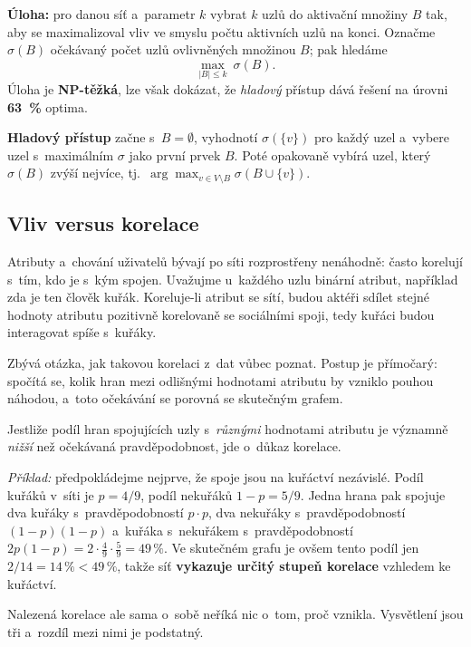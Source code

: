 \documentclass[11pt,a4paper]{article}
\theoremstyle{definition}
\begin{document}
\begin{defbox}
\textbf{Úloha:} pro danou síť a~parametr $k$ vybrat $k$ uzlů do aktivační množiny $B$ tak, aby
se maximalizoval vliv ve smyslu počtu aktivních uzlů na konci. Označme $\sigma(B)$ očekávaný
počet uzlů ovlivněných množinou $B$; pak hledáme
\[ \max_{|B|\le k}\ \sigma(B). \]
Úloha je \textbf{NP-těžká}, lze však dokázat, že \emph{hladový} přístup dává řešení na úrovni
\textbf{63~\%} optima.

\textbf{Hladový přístup} začne s~$B=\emptyset$, vyhodnotí $\sigma(\{v\})$ pro každý uzel
a~vybere uzel s~maximálním $\sigma$ jako první prvek $B$. Poté opakovaně vybírá uzel, který
$\sigma(B)$ zvýší nejvíce, tj.\ $\arg\max_{v\in V\setminus B}\sigma(B\cup\{v\})$.
\end{defbox}

\subsection{Vliv versus korelace}

Atributy a~chování uživatelů bývají po síti rozprostřeny nenáhodně: často korelují s~tím, kdo
je s~kým spojen. Uvažujme u~každého uzlu binární atribut, například zda je ten člověk kuřák.
Koreluje-li atribut se sítí, budou aktéři sdílet stejné hodnoty atributu pozitivně korelovaně
se sociálními spoji, tedy kuřáci budou interagovat spíše s~kuřáky.

Zbývá otázka, jak takovou korelaci z~dat vůbec poznat. Postup je přímočarý: spočítá se, kolik
hran mezi odlišnými hodnotami atributu by vzniklo pouhou náhodou, a~toto očekávání se porovná
se skutečným grafem.

\begin{defbox}
Jestliže podíl hran spojujících uzly s~\emph{různými} hodnotami atributu je významně
\emph{nižší} než očekávaná pravděpodobnost, jde o~důkaz korelace.

\emph{Příklad:} předpokládejme nejprve, že spoje jsou na kuřáctví nezávislé. Podíl kuřáků
v~síti je $p=4/9$, podíl nekuřáků $1-p=5/9$. Jedna hrana pak spojuje dva kuřáky
s~pravděpodobností $p\cdot p$, dva nekuřáky s~pravděpodobností $(1-p)(1-p)$ a~kuřáka
s~nekuřákem s~pravděpodobností $2p(1-p)=2\cdot\frac49\cdot\frac59=49\,\%$. Ve skutečném grafu
je ovšem tento podíl jen $2/14=14\,\%<49\,\%$, takže síť \textbf{vykazuje určitý stupeň
korelace} vzhledem ke kuřáctví.
\end{defbox}

Nalezená korelace ale sama o~sobě neříká nic o~tom, proč vznikla. Vysvětlení jsou tři
a~rozdíl mezi nimi je podstatný.
\end{document}

